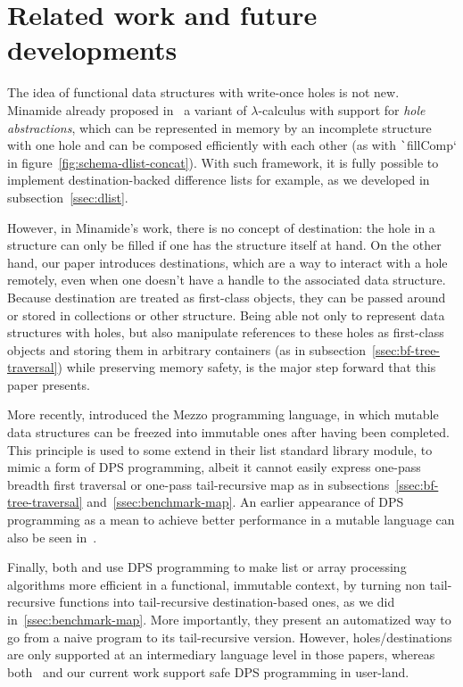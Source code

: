 \documentclass[english]{jflart}
\begin{document}
\section{Related work and future developments}

The idea of functional data structures with write-once holes is not new. Minamide already proposed in~\cite{minamide_functional_1998} a variant of $\lambda$-calculus with support for \emph{hole abstractions}, which can be represented in memory by an incomplete structure with one hole and can be composed efficiently with each other (as with \texttt`fillComp` in figure~\ref{fig:schema-dlist-concat}). With such framework, it is fully possible to implement destination-backed difference lists for example, as we developed in subsection~\ref{ssec:dlist}.

However, in Minamide's work, there is no concept of destination: the hole in a structure can only be filled if one has the structure itself at hand. On the other hand, our paper introduces destinations, which are a way to interact with a hole remotely, even when one doesn't have a handle to the associated data structure. Because destination are treated as first-class objects, they can be passed around or stored in collections or other structure. Being able not only to represent data structures with holes, but also manipulate references to these holes as first-class objects and storing them in arbitrary containers (as in subsection~\ref{ssec:bf-tree-traversal}) while preserving memory safety, is the major step forward that this paper presents.

More recently, \cite{protzenko_mezzo_2013} introduced the Mezzo programming language, in which mutable data structures can be freezed into immutable ones after having been completed. This principle is used to some extend in their list standard library module, to mimic a form of DPS programming, albeit it cannot easily express one-pass breadth first traversal or one-pass tail-recursive map as in subsections~\ref{ssec:bf-tree-traversal} and~\ref{ssec:benchmark-map}. An earlier appearance of DPS programming as a mean to achieve better performance in a mutable language can also be seen in~\cite{larus_restructuring_1989}.

Finally, both \cite{shaikhha_destination-passing_2017} and \cite{bour_tmc_2021} use DPS programming to make list or array processing algorithms more efficient in a functional, immutable context, by turning non tail-recursive functions into tail-recursive destination-based ones, as we did in~\ref{ssec:benchmark-map}. More importantly, they present an automatized way to go from a naive program to its tail-recursive version. However, holes/destinations are only supported at an intermediary language level in those papers, whereas both~\cite{minamide_functional_1998} and our current work support safe DPS programming in user-land.
\end{document}
